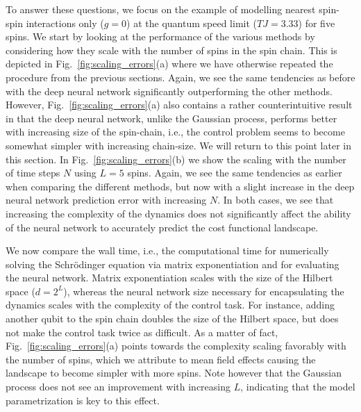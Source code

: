 \documentclass[aps, twocolumn,superscriptaddress]{revtex4-1}
\begin{document}
To answer these questions, we focus on the example of modelling nearest spin-spin interactions only ($g=0$) at the quantum speed limit ($TJ = 3.33$) for five spins. We start by looking at the performance of the various methods by considering how they scale with the number of spins in the spin chain. This is depicted in Fig.~\ref{fig:scaling_errors}(a) where we have otherwise repeated the procedure from the previous sections. Again, we see the same tendencies as before with the deep neural network significantly outperforming the other methods. However, Fig.~\ref{fig:scaling_errors}(a) also contains a rather counterintuitive result in that the deep neural network, unlike the Gaussian process, performs better with increasing size of the spin-chain, i.e., the control problem seems to become somewhat simpler with increasing chain-size. We will return to this point later in this section. In Fig.~\ref{fig:scaling_errors}(b) we show the scaling with the number of time steps $N$ using $L=5$ spins. Again, we see the same tendencies as earlier when comparing the different methods, but now with a slight increase in the deep neural network prediction error with increasing $N$.  In both cases, we see that increasing the complexity of the dynamics does not significantly affect the ability of the neural network to accurately predict the cost functional landscape.

We now compare the wall time, i.e., the computational time for numerically solving the Schrödinger equation via matrix exponentiation and for evaluating the neural network. Matrix exponentiation scales with the size of the Hilbert space  ($d = 2^L$), whereas the neural network size necessary for encapsulating the dynamics scales with the complexity of the control task. For instance, adding another qubit to the spin chain doubles the size of the Hilbert space, but does not make the control task twice as difficult. As a matter of fact, Fig.~\ref{fig:scaling_errors}(a) points towards the complexity scaling favorably with the number of spins, which we attribute to mean field effects causing the landscape to become simpler with more spins. Note however that the Gaussian process does not see an improvement with increasing $L$, indicating that the model parametrization is key to this effect. 
\end{document}
